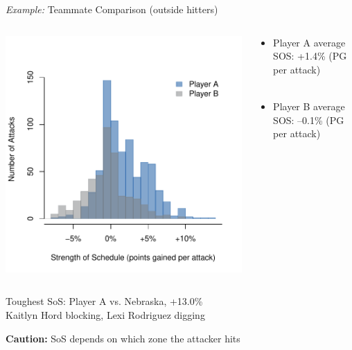 \documentclass[handout]{beamer}
\begin{document}
\begin{frame}{{\it Example:} Teammate Comparison (outside hitters)}
  \begin{columns}
    \begin{column}{0.5\columnwidth}
      \includegraphics[width = \textwidth]{images/teammate_comparison.pdf}
    \end{column}
    \begin{column}{0.5\columnwidth}
      \begin{itemize}
        \item Player A average SOS: +1.4\% (PG per attack)\\
        ~\\
        \item Player B average SOS: --0.1\% (PG per attack)
      \end{itemize}
    \end{column}
  \end{columns}
  \begin{center}
    Toughest SoS: Player A vs. Nebraska, +13.0\%\\
    Kaitlyn Hord blocking, Lexi Rodriguez digging
  \end{center}
  {\bf Caution:} SoS depends on which zone the attacker hits
\end{frame}
\end{document}
